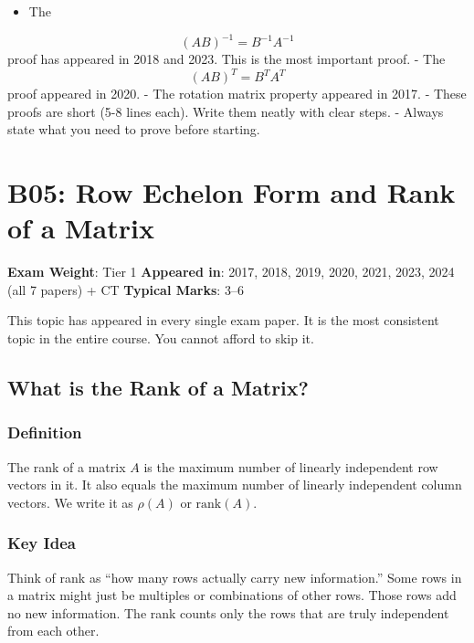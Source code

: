 \documentclass[
]{article}
\providecommand{\tightlist}{%
  \setlength{\itemsep}{0pt}\setlength{\parskip}{0pt}}
\renewenvironment{quote}
  {\begin{tcolorbox}[
     colback=calloutbg,
     colframe=calloutframe,
     colupper=callouttext,
     arc=3pt,
     boxrule=0.5pt,
     leftrule=0.5pt,
     borderline west={3pt}{0pt}{calloutaccent},
     left=8pt,
     right=8pt,
     top=6pt,
     bottom=6pt
   ]}
  {\end{tcolorbox}}
\begin{document}
\begin{itemize}
\tightlist
\item
  The
\end{itemize}
\[
(AB)^{-1} = B^{-1}A^{-1}
\]
proof has appeared in 2018 and 2023. This is the most important proof. -
The
\[
(AB)^T = B^T A^T
\]
proof appeared in 2020. - The rotation matrix property appeared in 2017.
- These proofs are short (5-8 lines each). Write them neatly with clear
steps. - Always state what you need to prove before starting.

\section{B05: Row Echelon Form and Rank of a
Matrix}\label{b05-row-echelon-form-and-rank-of-a-matrix}

\begin{quote}
\textbf{Exam Weight}: Tier 1 \textbar{} \textbf{Appeared in}: 2017,
2018, 2019, 2020, 2021, 2023, 2024 (all 7 papers) + CT \textbar{}
\textbf{Typical Marks}: 3--6
\end{quote}

This topic has appeared in every single exam paper. It is the most
consistent topic in the entire course. You cannot afford to skip it.

\subsection{What is the Rank of a
Matrix?}\label{what-is-the-rank-of-a-matrix}

\subsubsection{Definition}\label{definition-10}

The rank of a matrix \(A\) is the maximum number of linearly independent
row vectors in it. It also equals the maximum number of linearly
independent column vectors. We write it as \(\rho(A)\) or
\(\text{rank}(A)\).

\subsubsection{Key Idea}\label{key-idea}

Think of rank as ``how many rows actually carry new information.'' Some
rows in a matrix might just be multiples or combinations of other rows.
Those rows add no new information. The rank counts only the rows that
are truly independent from each other.
\end{document}
